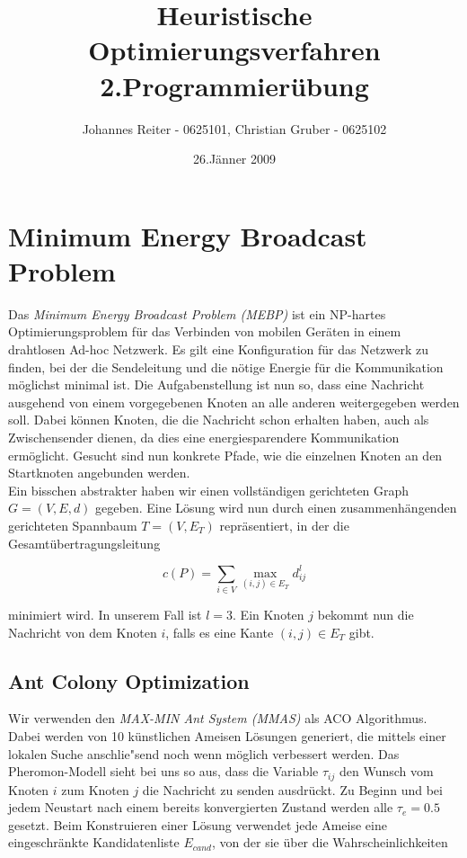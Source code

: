 \documentclass[a4paper,10pt]{article}
\title{Heuristische Optimierungsverfahren \\ \bigskip \textbf{2.Programmier\"{u}bung}}
\author{Johannes Reiter - 0625101, Christian Gruber - 0625102}
\date{26.J\"{a}nner 2009}
\begin{document}
\maketitle

\section{Minimum Energy Broadcast Problem}
Das \textit{Minimum Energy Broadcast Problem (MEBP)} ist ein NP-hartes Optimierungsproblem f\"{u}r das Verbinden von mobilen Ger\"{a}ten in einem drahtlosen Ad-hoc Netzwerk. Es gilt eine Konfiguration f\"{u}r das Netzwerk zu finden, bei der die Sendeleitung und die n\"{o}tige Energie f\"{u}r die Kommunikation m\"{o}glichst minimal ist. Die Aufgabenstellung ist nun so, dass eine Nachricht ausgehend von einem vorgegebenen Knoten an alle anderen weitergegeben werden soll. Dabei k\"{o}nnen Knoten, die die Nachricht schon erhalten haben, auch als Zwischensender dienen, da dies eine energiesparendere Kommunikation erm\"{o}glicht. Gesucht sind nun konkrete Pfade, wie die einzelnen Knoten an den Startknoten angebunden werden.\\
Ein bisschen abstrakter haben wir einen vollst\"{a}ndigen gerichteten Graph $G = (V,E,d)$ gegeben. Eine L\"{o}sung wird nun durch einen zusammenh\"{a}ngenden gerichteten Spannbaum $T = (V,E_{T})$ repr\"{a}sentiert, in der die Gesamt\"{u}bertragungsleitung

\begin{displaymath} 
c(P) = \sum_{i \in V} \max_{(i,j) \in E_T} d_{ij}^l
\end{displaymath}

minimiert wird. In unserem Fall ist $l=3$. Ein Knoten $j$ bekommt nun die Nachricht von dem Knoten $i$, falls es eine Kante $(i,j) \in E_T$ gibt.

\subsection{Ant Colony Optimization}
Wir verwenden den \textit{MAX-MIN Ant System (MMAS)} als ACO Algorithmus. Dabei werden von 10 k\"{u}nstlichen Ameisen L\"{o}sungen generiert, die mittels einer lokalen Suche anschlie"send noch wenn m\"{o}glich verbessert werden. Das Pheromon-Modell sieht bei uns so aus, dass die Variable $\tau_{ij}$ den Wunsch vom Knoten $i$ zum Knoten $j$ die Nachricht zu senden ausdr\"{u}ckt. Zu Beginn und bei jedem Neustart nach einem bereits konvergierten Zustand werden alle $\tau_e = 0.5$ gesetzt. Beim Konstruieren einer L\"{o}sung verwendet jede Ameise eine eingeschr\"{a}nkte Kandidatenliste $E_{cand}$, von der sie \"{u}ber die Wahrscheinlichkeiten
\end{document}

